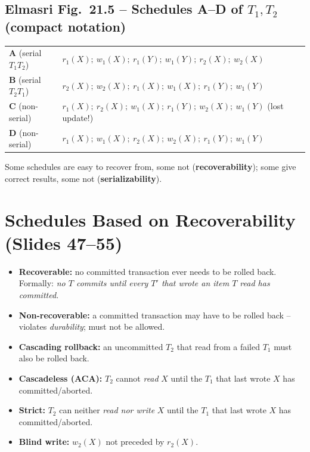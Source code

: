 \documentclass[10pt,a4paper]{article}
\newcommand{\ri}[2]{r_{#1}(#2)}
\newcommand{\wi}[2]{w_{#1}(#2)}
\begin{document}
\subsection*{Elmasri Fig.~21.5 -- Schedules A--D of $T_1,T_2$ (compact notation)}
\begin{tabular}{@{}ll@{}}
\textbf{A} (serial $T_1T_2$) & $\ri1X;\ \wi1X;\ \ri1Y;\ \wi1Y;\ \ri2X;\ \wi2X$\\
\textbf{B} (serial $T_2T_1$) & $\ri2X;\ \wi2X;\ \ri1X;\ \wi1X;\ \ri1Y;\ \wi1Y$\\
\textbf{C} (non-serial) & $\ri1X;\ \ri2X;\ \wi1X;\ \ri1Y;\ \wi2X;\ \wi1Y$ \quad (lost update!)\\
\textbf{D} (non-serial) & $\ri1X;\ \wi1X;\ \ri2X;\ \wi2X;\ \ri1Y;\ \wi1Y$\\
\end{tabular}

Some schedules are easy to recover from, some not (\textbf{recoverability}); some give correct results, some not (\textbf{serializability}).

\section{Schedules Based on Recoverability (Slides 47--55)}

\begin{keybox}[Definitions]
\begin{itemize}
  \item \textbf{Recoverable:} no committed transaction ever needs to be rolled back. Formally: \emph{no $T$ commits until every $T'$ that wrote an item $T$ read has committed.}
  \item \textbf{Non-recoverable:} a committed transaction may have to be rolled back -- violates \emph{durability}; must not be allowed.
  \item \textbf{Cascading rollback:} an uncommitted $T_2$ that read from a failed $T_1$ must also be rolled back.
  \item \textbf{Cascadeless (ACA):} $T_2$ cannot \emph{read} $X$ until the $T_1$ that last wrote $X$ has committed/aborted.
  \item \textbf{Strict:} $T_2$ can neither \emph{read nor write} $X$ until the $T_1$ that last wrote $X$ has committed/aborted.
  \item \textbf{Blind write:} $w_2(X)$ not preceded by $r_2(X)$.
\end{itemize}
\end{keybox}
\end{document}
